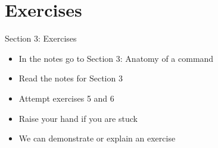 \section{Exercises}
\begin{frame}{Section 3: Exercises}
\begin{itemize}
\item In the notes go to Section 3: Anatomy of a command
\item Read the notes for Section 3 
\item Attempt exercises 5 and 6
\item Raise your hand if you are stuck
\item We can demonstrate or explain an exercise
\end{itemize}
\end{frame}

